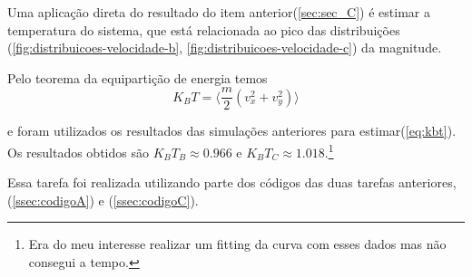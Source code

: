 Uma aplicação direta do resultado do item anterior(\ref{sec:sec_C}) é estimar a temperatura do sistema, 
que está relacionada ao pico das distribuições (\ref{fig:distribuicoes-velocidade-b}, \ref{fig:distribuicoes-velocidade-c})
da magnitude.

Pelo teorema da equipartição de energia temos
\begin{equation}
    K_B T = \langle \frac{m}{2} \left( v_x^2 + v_y^2 \right) \rangle
    \label{eq:kbt}
\end{equation}

e foram utilizados os resultados das simulações anteriores para estimar(\ref{eq:kbt}). Os resultados 
obtidos são $K_B T_B \approx 0.966$ e $K_B T_C \approx 1.018$.\footnote{Era do meu interesse realizar um fitting da curva com esses dados mas não consegui a tempo.}


Essa tarefa foi realizada utilizando parte dos códigos das duas tarefas anteriores, (\ref{ssec:codigoA}) e (\ref{ssec:codigoC}). 